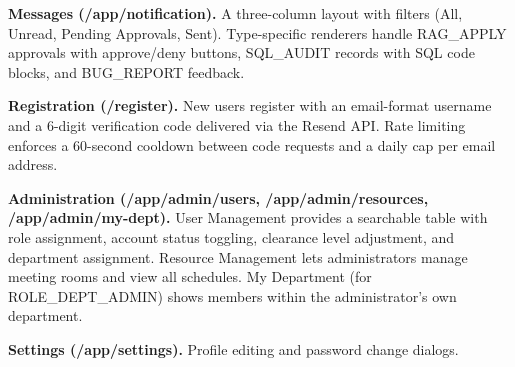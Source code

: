\textbf{Messages (/app/notification).} A three-column layout with filters (All, Unread, Pending Approvals, Sent). Type-specific renderers handle RAG\_APPLY approvals with approve/deny buttons, SQL\_AUDIT records with SQL code blocks, and BUG\_REPORT feedback.

\textbf{Registration (/register).} New users register with an email-format username and a 6-digit verification code delivered via the Resend API. Rate limiting enforces a 60-second cooldown between code requests and a daily cap per email address.

\textbf{Administration (/app/admin/users, /app/admin/resources, /app/admin/my-dept).} User Management provides a searchable table with role assignment, account status toggling, clearance level adjustment, and department assignment. Resource Management lets administrators manage meeting rooms and view all schedules. My Department (for ROLE\_DEPT\_ADMIN) shows members within the administrator's own department.

\textbf{Settings (/app/settings).} Profile editing and password change dialogs.

\newpage

